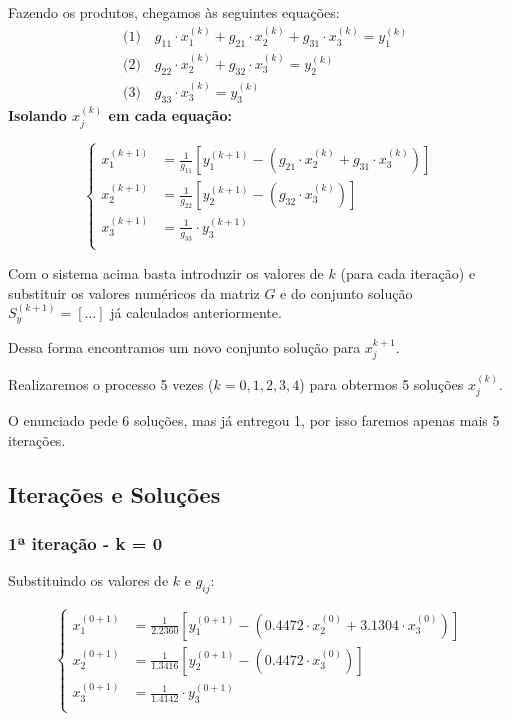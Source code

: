 \documentclass[12pt,a4paper]{article}
\begin{document}
Fazendo os produtos, chegamos às seguintes equações:
\begin{align*}
&\text{(1)} \quad g_{11} \cdot x_1^{(k)} + g_{21} \cdot x_2^{(k)} + g_{31} \cdot x_3^{(k)} = y_1^{(k)} \\
&\text{(2)} \quad g_{22} \cdot x_2^{(k)} + g_{32} \cdot x_3^{(k)} = y_2^{(k)} \\
&\text{(3)} \quad g_{33} \cdot x_3^{(k)} = y_3^{(k)}
\end{align*}
\[\]
\textbf{Isolando $x_j^{(k)}$ em cada equação:}

\vspace{0.5cm}

\[
\left\{
\begin{aligned}
x_1^{(k+1)} &= \frac{1}{g_{11}} \left[ y_1^{(k+1)} - \left(g_{21} \cdot x_2^{(k)} + g_{31} \cdot x_3^{(k)}\right) \right] \\
x_2^{(k+1)} &= \frac{1}{g_{22}} \left[ y_2^{(k+1)} - \left(g_{32} \cdot x_3^{(k)}\right) \right] \\
x_3^{(k+1)} &= \frac{1}{g_{33}} \cdot y_3^{(k+1)} \\
\end{aligned}
\right.
\]

\vspace{0.5cm}

Com o sistema acima basta introduzir os valores de \textbf{$k$} (para cada iteração) e substituir os valores numéricos da matriz $G$ e do conjunto solução $S_y^{(k + 1)} = [\ldots]$ já calculados anteriormente.

Dessa forma encontramos um novo conjunto solução para $x_j^{k+1}$.

Realizaremos o processo 5 vezes ($k=0,1,2,3,4$) para obtermos 5 soluções $x_j^{(k)}$.

O enunciado pede 6 soluções, mas já entregou 1, por isso faremos apenas mais 5 iterações.

\subsection{Iterações e Soluções}

\subsubsection{1ª iteração - k = 0}

Substituindo os valores de $k$ e $g_{ij}$:

\[
\left\{
\begin{aligned}
x_1^{(0+1)} &= \frac{1}{2.2360} \left[ y_1^{(0+1)} - \left(0.4472 \cdot x_2^{(0)} + 3.1304 \cdot x_3^{(0)}\right) \right] \\
x_2^{(0+1)} &= \frac{1}{1.3416} \left[ y_2^{(0+1)} - \left(0.4472 \cdot x_3^{(0)}\right) \right] \\
x_3^{(0+1)} &= \frac{1}{1.4142} \cdot y_3^{(0+1)} \\
\end{aligned}
\right.
\]
\end{document}
